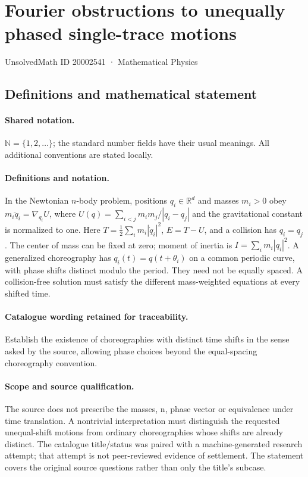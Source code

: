 \documentclass[11pt]{article}
\begin{document}
\setcounter{section}{20002540}
\section{Fourier obstructions to unequally phased single-trace motions}\label{20002541}
{\small UnsolvedMath ID 20002541 · Mathematical Physics}
\subsection{Definitions and mathematical statement}

\paragraph{Shared notation.}$\mathbb N=\{1,2,\ldots\}$; the standard number fields have their usual meanings. All additional conventions are stated locally.


\paragraph{Definitions and notation.}In the Newtonian $n$-body problem, positions $q_i\in\mathbb R^d$ and masses $m_i>0$ obey $m_i\ddot q_i=\nabla_{q_i}U$, where $U(q)=\sum_{i<j}m_im_j/|q_i-q_j|$ and the gravitational constant is normalized to one. Here $T=\tfrac12\sum_i m_i|\dot q_i|^2$, $E=T-U$, and a collision has $q_i=q_j$. The center of mass can be fixed at zero; moment of inertia is $I=\sum_i m_i|q_i|^2$. A generalized choreography has $q_i(t)=q(t+\theta_i)$ on a common periodic curve, with phase shifts distinct modulo the period. They need not be equally spaced. A collision-free solution must satisfy the different mass-weighted equations at every shifted time.

\paragraph{Catalogue wording retained for traceability.}
Establish the existence of choreographies with distinct time shifts in the sense asked by the source, allowing phase choices beyond the equal-spacing choreography convention.
\paragraph{Scope and source qualification.}The source does not prescribe the masses, n, phase vector or equivalence under time translation. A nontrivial interpretation must distinguish the requested unequal-shift motions from ordinary choreographies whose shifts are already distinct. The catalogue title/status was paired with a machine-generated research attempt; that attempt is not peer-reviewed evidence of settlement. The statement covers the original source questions rather than only the title’s subcase.
\end{document}
